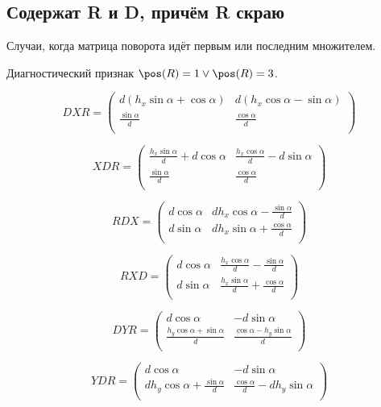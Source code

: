 \subsection{Содержат R и D, причём R скраю}

Случаи, когда матрица поворота идёт первым или последним множителем.

Диагностический признак $\pos(R)=1 \vee \pos(R)=3 $.

$$DXR =
 \begin{pmatrix} d \left(
 h_x \sin\alpha + \cos\alpha \right) & d \left( h_x \cos\alpha - \sin\alpha
 \right) \\
\displaystyle\frac{\sin\alpha}{d} & \displaystyle\frac{\cos\alpha}{d} \\
 \end{pmatrix} $$

$$XDR =
 \begin{pmatrix} \displaystyle\frac{h_x \sin\alpha}{d} + d \cos\alpha & \displaystyle\frac{h_x \cos\alpha}{d} - d \sin\alpha \\
\displaystyle\frac{\sin\alpha}{d} & \displaystyle\frac{\cos\alpha}{d} \\
 \end{pmatrix} $$
 
$$RDX =
 \begin{pmatrix} d \cos\alpha &
 d h_x \cos\alpha - \displaystyle\frac{\sin\alpha}{d} \\
d \sin\alpha & d h_x \sin\alpha + \displaystyle\frac{\cos\alpha}{d} \\
 \end{pmatrix} $$
 
$$RXD =
 \begin{pmatrix} d \cos\alpha &
 \displaystyle\frac{h_x \cos\alpha}{d} - \displaystyle\frac{\sin\alpha}{d} \\
d \sin\alpha & \displaystyle\frac{
 h_x \sin\alpha}{d} + \displaystyle\frac{\cos\alpha}{d} \\
 \end{pmatrix} $$

$$DYR =
 \begin{pmatrix} d \cos\alpha &
 - d \sin\alpha \\
\displaystyle\frac{h_y \cos\alpha + \sin\alpha}{d} & \displaystyle\frac{\cos\alpha - h_y \sin\alpha}{d} \\
 \end{pmatrix} $$
 
$$YDR =
 \begin{pmatrix} d \cos\alpha &
 - d \sin\alpha \\
d h_y \cos\alpha + \displaystyle\frac{\sin\alpha}{d} & \displaystyle\frac{\cos\alpha }{d} - d h_y \sin\alpha \\
 \end{pmatrix} $$

